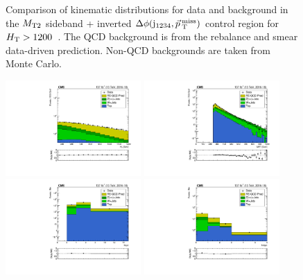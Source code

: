 \begin{figure}[!htbp]
\begin{center}
    \caption{Comparison of kinematic distributions for data and background in the $M_{\mathrm{T2}}$ sideband + inverted $\Delta\phi(\mathrm{j}_{1234},\vec{p}_{\> \mathrm{T}}^{\> \mathrm{miss}})$ control region for $H_{\mathrm{T}} > 1200$~\GeV. The QCD background is from the
             rebalance and smear data-driven prediction. Non-QCD backgrounds are taken from Monte Carlo.
            }
    \label{Fig:rs_crRSDPhiMT2InclusiveHT1200toInf}
  \end{center}
\end{figure}

\begin{figure}[!htbp]
  \begin{center}
    \includegraphics[width=0.46\textwidth]{figs/qcd/rs_data/c_crRSDPhiMT2InclusiveHT450to1200_h_ht.pdf}
    \includegraphics[width=0.46\textwidth]{figs/qcd/rs_data/c_crRSDPhiMT2InclusiveHT450to1200_h_met.pdf}
    \includegraphics[width=0.46\textwidth]{figs/qcd/rs_data/c_crRSDPhiMT2InclusiveHT450to1200_h_nJet30.pdf}
    \includegraphics[width=0.46\textwidth]{figs/qcd/rs_data/c_crRSDPhiMT2InclusiveHT450to1200_h_nBJet20.pdf}

\end{center}
\end{figure}

